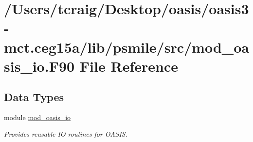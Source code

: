 \hypertarget{mod__oasis__io_8_f90}{\section{/\+Users/tcraig/\+Desktop/oasis/oasis3-\/mct.ceg15a/lib/psmile/src/mod\+\_\+oasis\+\_\+io.F90 File Reference}
\label{mod__oasis__io_8_f90}
}
\subsection*{Data Types}
\begin{DoxyCompactItemize}
\item 
module \hyperlink{classmod__oasis__io}{mod\+\_\+oasis\+\_\+io}
\begin{DoxyCompactList}\small\item\em Provides reusable I\+O routines for O\+A\+S\+I\+S. \end{DoxyCompactList}\end{DoxyCompactItemize}
